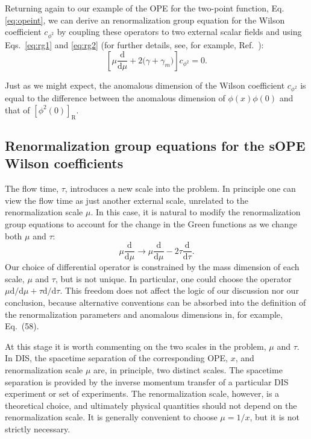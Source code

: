 Returning again to our example of the OPE for the two-point function, Eq.~
\eqref{eq:opeint}, we can derive an renormalization group equation for the 
Wilson coefficient 
$c_{\phi^2}$ by coupling these operators to two external scalar fields and 
using Eqs.~\eqref{eq:rg1} and \eqref{eq:rg2} (for further details, see, for 
example, Ref.~\cite{Collins:1984rdg}):
\begin{equation}
\left[\mu\frac{\mathrm{d}}{\mathrm{d} \mu} 
 + 2\big(\gamma +\gamma_m\big)\right]c_{\phi^2} = 0.
\end{equation}

Just as we might expect, the anomalous dimension of the Wilson coefficient 
$c_{\phi^2}$ is equal to the difference between the anomalous dimension of 
$\phi(x)\phi(0)$ and that of $[\phi^2(0)]_{\mathrm{R}}$.

\subsection{Renormalization group equations for the sOPE Wilson coefficients}

The flow time, $\tau$, introduces a new scale into the problem. In principle 
one can view the flow time as just another external scale, unrelated to the 
renormalization scale $\mu$. In this case, it is natural to modify the 
renormalization group equations to account for the change in the Green 
functions as we change both $\mu$ and $\tau$:
\begin{equation}
\mu\frac{\mathrm{d}}{\mathrm{d} \mu}\rightarrow  
\mu\frac{\mathrm{d}}{\mathrm{d} 
\mu}- 2\tau \frac{\mathrm{d}}{\mathrm{d} \tau}.
\end{equation}
Our choice of differential operator is constrained by the mass dimension of 
each scale, $\mu$ and $\tau$, but is not unique. In particular, one could 
choose 
the operator $\mu\mathrm{d}/\mathrm{d} 
\mu + \tau \mathrm{d}/\mathrm{d} \tau$. This freedom does not affect 
the logic of our discussion nor our conclusion, because alternative conventions 
can be absorbed into the definition of the renormalization parameters and 
anomalous dimensions in, for example, Eq.~(58).

At this stage it is worth commenting on the two scales in the problem, $\mu$ 
and $\tau$. In DIS, the spacetime separation of the corresponding
OPE, $x$, and renormalization scale $\mu$ are, in principle, two distinct 
scales. The spacetime separation is provided by the inverse momentum transfer 
of a particular DIS experiment or set of experiments. The renormalization 
scale, however, is a theoretical choice, and ultimately physical quantities 
should not depend on the renormalization scale. It is generally convenient to 
choose $\mu = 1/x$, but it is not strictly necessary.

